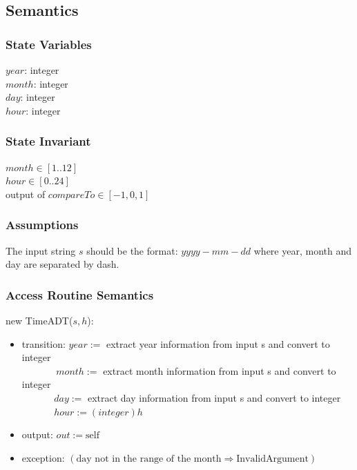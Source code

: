 \documentclass[12pt]{article}
\begin{document}
\subsection* {Semantics}

\subsubsection* {State Variables}

$year$: integer\\
$month$: integer\\
$day$: integer\\
$hour$: integer\\

\subsubsection* {State Invariant}

$month \in [1..12]$ \\
$hour \in [0..24]$ \\
output of $compareTo \in [-1, 0, 1]$ 

\subsubsection* {Assumptions}

The input string $s$ should be the format: $yyyy-mm-dd$ where year, month and day are separated by dash.\\

\subsubsection* {Access Routine Semantics}

\noindent new TimeADT($s, h$):
\begin{itemize}
\item transition: $year :=$ extract year information from input s and convert to integer
\\$~~~~~~~~~~~~~~~~month :=$ extract month information from input s and convert to integer
\\$~~~~~~~~~~~~~~~day :=$ extract day information from input s and convert to integer
\\$~~~~~~~~~~~~~~~hour := (integer) h$
\item output: $out := \mbox{self}$
\item exception: $(\text{day not in the range of the month}  \Rightarrow \text{InvalidArgument})$
\end{itemize}
\end{document}
